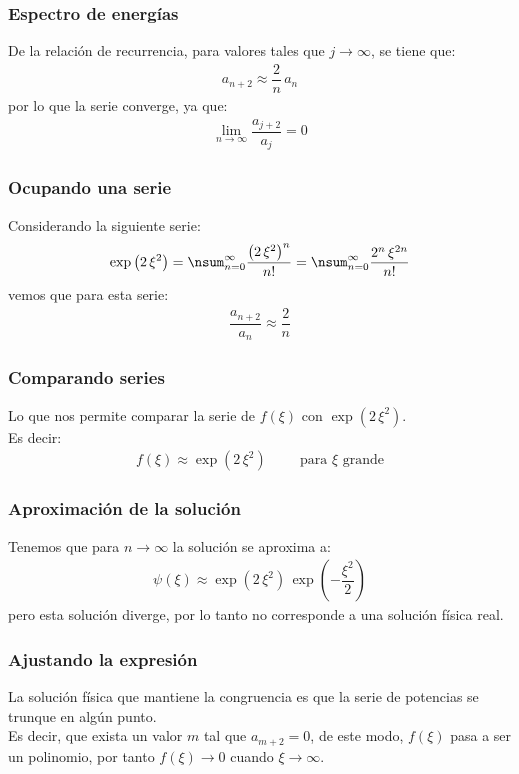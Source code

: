 \documentclass[12pt]{beamer}
\begin{document}
\begin{frame}
\frametitle{Espectro de energías}
De la relación de recurrencia, para valores tales que $j \to \infty$, se tiene que:
\pause
\begin{align*}
a_{n+2} \approx \dfrac{2}{n} \, a_{n}
\end{align*}
\pause
por lo que la serie converge, ya que:
\pause
\begin{align*}
\displaystyle{\lim_{n \to \infty}} \dfrac{a_{j+2}}{a_{j}} = 0
\end{align*}
\end{frame}
\begin{frame}
\frametitle{Ocupando una serie}
Considerando la siguiente serie:
\pause
\begin{align*}
\exp \left( 2 \, \xi^{2} \right) = \nsum_{n=0}^{\infty} \dfrac{\left( 2 \, \xi^{2} \right)^{n}}{n!} = \nsum_{n=0}^{\infty} \dfrac{2^{n} \, \xi^{2n}}{n!}
\end{align*}
vemos que para esta serie:
\begin{align*}
\dfrac{a_{n+2}}{a_{n}} \approx \dfrac{2}{n}
\end{align*}
\end{frame}
\begin{frame}
\frametitle{Comparando series}
Lo que nos permite comparar la serie de $f(\xi)$ con $\exp( 2 \, \xi^{2})$.
\pause
\\
\bigskip
Es decir:
\begin{align*}
f(\xi) \approx \exp \left( 2 \, \xi^{2} \right) \hspace{1cm} \mbox{para $\xi$ grande}
\end{align*}
\end{frame}
\begin{frame}
\frametitle{Aproximación de la solución}
Tenemos que para $n \to \infty$ la solución se aproxima a:
\pause
\begin{align*}
\psi(\xi) \approx \exp \left( 2 \, \xi^{2}  \right) \, \exp \left( - \dfrac{\xi^{2}}{2} \right)
\end{align*}
\pause
pero esta solución diverge, por lo tanto no corresponde a una solución física real.
\end{frame}
\begin{frame}
\frametitle{Ajustando la expresión}
La solución física que mantiene la congruencia es que la serie de potencias se trunque en algún punto.
\\
\bigskip
\pause
Es decir, que exista un valor $m$ tal que $a_{m+2} = 0$, de este modo, $f(\xi)$ pasa a ser un polinomio, \pause por tanto $f(\xi) \to 0$ cuando $\xi \to \infty$.
\end{frame}
\end{document}
